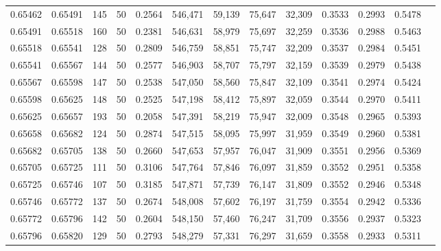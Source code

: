 \begin{tabular}{rrrrrrrrrrrrr}
0.65462 & 0.65491 &   145 &  50 &                                     0.2564 & 546,471 &  59,139 &  75,647 &  32,309 & 0.3533 & 0.2993 & 0.5478 \\
0.65491 & 0.65518 &   160 &  50 &                                     0.2381 & 546,631 &  58,979 &  75,697 &  32,259 & 0.3536 & 0.2988 & 0.5463 \\
0.65518 & 0.65541 &   128 &  50 &                                     0.2809 & 546,759 &  58,851 &  75,747 &  32,209 & 0.3537 & 0.2984 & 0.5451 \\
0.65541 & 0.65567 &   144 &  50 &                                     0.2577 & 546,903 &  58,707 &  75,797 &  32,159 & 0.3539 & 0.2979 & 0.5438 \\
0.65567 & 0.65598 &   147 &  50 &                                     0.2538 & 547,050 &  58,560 &  75,847 &  32,109 & 0.3541 & 0.2974 & 0.5424 \\
0.65598 & 0.65625 &   148 &  50 &                                     0.2525 & 547,198 &  58,412 &  75,897 &  32,059 & 0.3544 & 0.2970 & 0.5411 \\
0.65625 & 0.65657 &   193 &  50 &                                     0.2058 & 547,391 &  58,219 &  75,947 &  32,009 & 0.3548 & 0.2965 & 0.5393 \\
0.65658 & 0.65682 &   124 &  50 &                                     0.2874 & 547,515 &  58,095 &  75,997 &  31,959 & 0.3549 & 0.2960 & 0.5381 \\
0.65682 & 0.65705 &   138 &  50 &                                     0.2660 & 547,653 &  57,957 &  76,047 &  31,909 & 0.3551 & 0.2956 & 0.5369 \\
0.65705 & 0.65725 &   111 &  50 &                                     0.3106 & 547,764 &  57,846 &  76,097 &  31,859 & 0.3552 & 0.2951 & 0.5358 \\
0.65725 & 0.65746 &   107 &  50 &                                     0.3185 & 547,871 &  57,739 &  76,147 &  31,809 & 0.3552 & 0.2946 & 0.5348 \\
0.65746 & 0.65772 &   137 &  50 &                                     0.2674 & 548,008 &  57,602 &  76,197 &  31,759 & 0.3554 & 0.2942 & 0.5336 \\
0.65772 & 0.65796 &   142 &  50 &                                     0.2604 & 548,150 &  57,460 &  76,247 &  31,709 & 0.3556 & 0.2937 & 0.5323 \\
0.65796 & 0.65820 &   129 &  50 &                                     0.2793 & 548,279 &  57,331 &  76,297 &  31,659 & 0.3558 & 0.2933 & 0.5311 \\

\end{tabular}
